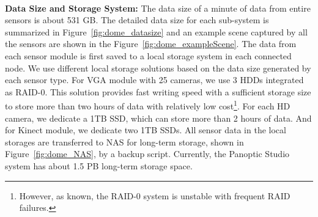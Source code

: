 \mbox{ }\\
\noindent \textbf{Data Size and Storage System:} The data size of a minute of data from entire sensors is about 531 GB. The detailed data size for each sub-system is summarized in Figure~\ref{fig:dome_datasize} and an example scene captured by all the sensors are shown in the Figure~\ref{fig:dome_exampleScene}. The data from each sensor module is first saved to a local storage system in each connected node. We use different local storage solutions based on the data size generated by each sensor type. For VGA module with 25 cameras, we use 3 HDDs integrated as RAID-0. This solution provides fast writing speed with a sufficient storage size to store more than two hours of data with relatively low cost\footnote{However, as known, the RAID-0 system is unstable with frequent RAID failures.}. For each HD camera, we dedicate a 1TB SSD, which can store more than 2 hours of data. And for Kinect module, we dedicate two 1TB SSDs. All sensor data in the local storages are transferred to NAS for long-term storage, shown in Figure~\ref{fig:dome_NAS}, by a backup script. Currently, the Panoptic Studio system has about 1.5 PB long-term storage space.



